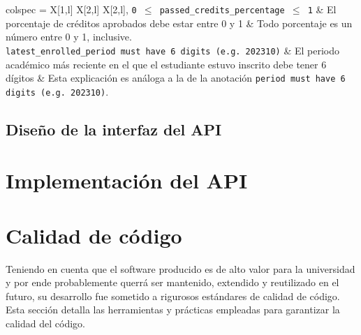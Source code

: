 \begin{longtblr}[
		caption = {Anotaciones del diagrama de clases y su significado},
		label = {tab:anotaciones},
	]{
		colspec = {X[1,l] X[2,l] X[2,l]},
	}
	\texttt{0 \ensuremath{\leq} passed\_credits\_percentage \ensuremath{\leq} 1} & El porcentaje de créditos aprobados debe estar entre 0 y 1                                                                 & Todo porcentaje es un número entre 0 y 1, inclusive.                                                                                                                                                                                                               \\
	\texttt{latest\_enrolled\_period must have 6 digits (e.g. 202310)}           & El periodo académico más reciente en el que el estudiante estuvo inscrito debe tener 6 dígitos                             & Esta explicación es análoga a la de la anotación \texttt{period must have 6 digits (e.g. 202310)}.                                                                                                                                                                 \\
	\hline
\end{longtblr}

\subsection{Diseño de la interfaz del API}


\section{Implementación del API}

\section{Calidad de código}


Teniendo en cuenta que el software producido es de alto valor para la universidad y por ende probablemente querrá ser mantenido, extendido y reutilizado en el futuro, su desarrollo fue sometido a rigurosos estándares de calidad de código. Esta sección detalla las herramientas y prácticas empleadas para garantizar la calidad del código.

